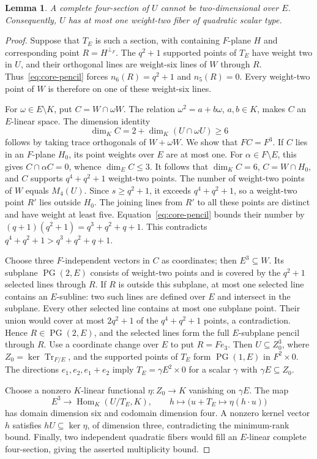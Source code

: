 \documentclass[12pt,letterpaper,onecolumn]{article}
\newtheorem{lemma}[theorem]{Lemma}
\theoremstyle{definition}
\theoremstyle{remark}
\DeclareMathOperator{\Tr}{Tr}
\DeclareMathOperator{\Hom}{Hom}
\DeclareMathOperator{\PG}{PG}
\begin{document}
\begin{lemma}\label{lem:core-quadratic-repeat}
A complete four-section of \(U\) cannot be two-dimensional over \(E\).
Consequently, \(U\) has at most one weight-two fiber of quadratic scalar type.
\end{lemma}
\begin{proof}
Suppose that \(T_E\) is such a section, with containing \(F\)-plane \(H\) and corresponding point \(R=H^{\perp_F}\).
The \(q^2+1\) supported points of \(T_E\) have weight two in \(U\), and their orthogonal lines are weight-six lines of \(W\) through \(R\).
Thus~\eqref{eq:core-pencil} forces \(n_6(R)=q^2+1\) and \(n_5(R)=0\).
Every weight-two point of \(W\) is therefore on one of these weight-six lines.

For \(\omega\in E\setminus K\), put \(C=W\cap\omega W\).
The relation \(\omega^2=a+b\omega\), \(a,b\in K\), makes \(C\) an \(E\)-linear space.
The dimension identity
\[
\dim_K C=2+\dim_K(U\cap\omega U)\ge6
\]
follows by taking trace orthogonals of \(W+\omega W\).
We show that \(FC=F^3\).
If \(C\) lies in an \(F\)-plane \(H_0\), its point weights over \(E\) are at most one.
For \(\alpha\in F\setminus E\), this gives \(C\cap\alpha C=0\), whence \(\dim_E C\le3\).
It follows that \(\dim_K C=6\), \(C=W\cap H_0\), and \(C\) supports \(q^4+q^2+1\) weight-two points.
The number of weight-two points of \(W\) equals \(M_4(U)\).
Since \(s\ge q^2+1\), it exceeds \(q^4+q^2+1\), so a weight-two point \(R'\) lies outside \(H_0\).
The joining lines from \(R'\) to all these points are distinct and have weight at least five.
Equation~\eqref{eq:core-pencil} bounds their number by
\((q+1)(q^2+1)=q^3+q^2+q+1\).
This contradicts \(q^4+q^2+1>q^3+q^2+q+1\).

Choose three \(F\)-independent vectors in \(C\) as coordinates; then \(E^3\subseteq W\).
Its subplane \(\PG(2,E)\) consists of weight-two points and is covered by the \(q^2+1\) selected lines through \(R\).
If \(R\) is outside this subplane, at most one selected line contains an \(E\)-subline: two such lines are defined over \(E\) and intersect in the subplane.
Every other selected line contains at most one subplane point.
Their union would cover at most \(2q^2+1\) of the \(q^4+q^2+1\) points, a contradiction.
Hence \(R\in\PG(2,E)\), and the selected lines form the full \(E\)-subplane pencil through \(R\).
Use a coordinate change over \(E\) to put \(R=Fe_3\).
Then \(U\subseteq Z_0^3\), where \(Z_0=\ker\Tr_{F/E}\), and the supported points of \(T_E\) form \(\PG(1,E)\) in \(F^2\times0\).
The directions \(e_1,e_2,e_1+e_2\) imply
\(T_E=\gamma E^2\times0\) for a scalar \(\gamma\) with \(\gamma E\subseteq Z_0\).

Choose a nonzero \(K\)-linear functional \(\eta:Z_0\to K\) vanishing on \(\gamma E\).
The map
\[
E^3\longrightarrow\Hom_K(U/T_E,K),\qquad
h\longmapsto\bigl(u+T_E\mapsto\eta(h\cdot u)\bigr)
\]
has domain dimension six and codomain dimension four.
A nonzero kernel vector \(h\) satisfies \(hU\subseteq\ker\eta\), of dimension three, contradicting the minimum-rank bound.
Finally, two independent quadratic fibers would fill an \(E\)-linear complete four-section, giving the asserted multiplicity bound.
\end{proof}
\end{document}
